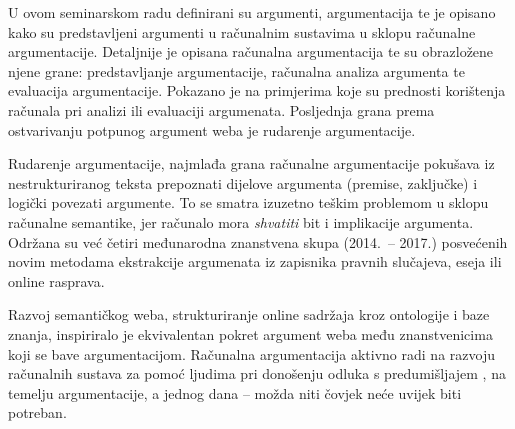 U ovom seminarskom radu definirani su argumenti, argumentacija 
te je opisano kako su predstavljeni
argumenti u računalnim sustavima u sklopu računalne argumentacije. 
Detaljnije je opisana računalna argumentacija te su obrazložene 
njene grane: predstavljanje argumentacije, računalna analiza argumenta 
te evaluacija argumentacije. Pokazano je na primjerima
koje su prednosti korištenja računala pri analizi 
ili evaluaciji argumenata.  
Posljednja grana prema ostvarivanju potpunog 
argument weba je rudarenje argumentacije. 

Rudarenje argumentacije, najmlađa grana računalne argumentacije 
pokušava iz nestrukturiranog teksta
prepoznati dijelove argumenta (premise, zaključke)
i logički povezati argumente. To se 
smatra izuzetno teškim problemom 
u sklopu računalne semantike, jer računalo 
mora \emph{shvatiti} bit i implikacije argumenta. 
Održana su već četiri međunarodna  znanstvena 
skupa (2014.\ -- 2017.) posvećenih novim metodama
ekstrakcije argumenata iz zapisnika pravnih slučajeva,
eseja ili online rasprava.

Razvoj semantičkog weba, strukturiranje 
online sadržaja kroz ontologije i baze znanja, 
inspiriralo je ekvivalentan pokret 
argument weba među
znanstvenicima koji se bave argumentacijom.
Računalna argumentacija 
aktivno radi na razvoju računalnih sustava
za pomoć ljudima pri 
donošenju odluka s predumišljajem ,
na temelju argumentacije, a jednog dana --
možda niti čovjek neće uvijek biti potreban.

 
 
